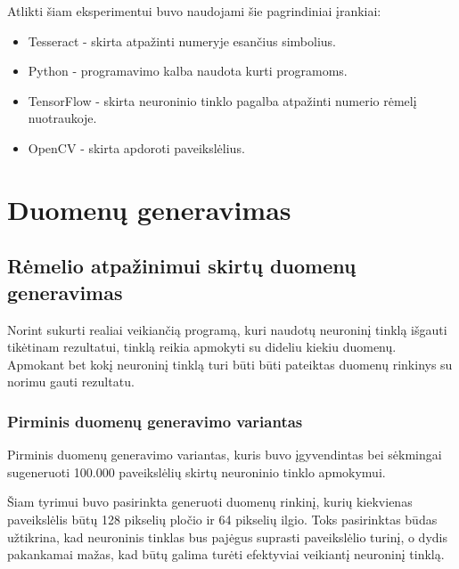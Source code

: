 \documentclass{VUMIFInfBakalaurinis}
\begin{document}
Atlikti šiam eksperimentui buvo naudojami šie pagrindiniai įrankiai:

\begin{itemize}
  \item Tesseract - skirta atpažinti numeryje esančius simbolius.
  \item Python - programavimo kalba naudota kurti programoms.
  \item TensorFlow - skirta neuroninio tinklo pagalba atpažinti numerio rėmelį nuotraukoje.
  \item OpenCV - skirta apdoroti paveikslėlius.
\end{itemize}

\pagebreak
\section{Duomenų generavimas}

\subsection{Rėmelio atpažinimui skirtų duomenų generavimas} \label{Mokymo duomenų generavimas}
Norint sukurti realiai veikiančią programą, kuri naudotų neuroninį tinklą išgauti tikėtinam rezultatui,
tinklą reikia apmokyti su dideliu kiekiu duomenų. Apmokant bet kokį neuroninį tinklą turi būti būti pateiktas
duomenų rinkinys su norimu gauti rezultatu. 

\subsubsection{Pirminis duomenų generavimo variantas}
Pirminis duomenų generavimo variantas, kuris buvo įgyvendintas bei sėkmingai sugeneruoti 100.000 paveikslėlių skirtų neuroninio tinklo apmokymui.

Šiam tyrimui buvo pasirinkta generuoti duomenų rinkinį, kurių kiekvienas paveikslėlis būtų 128 pikselių
pločio ir 64 pikselių ilgio. Toks pasirinktas būdas užtikrina, kad neuroninis tinklas bus pajėgus suprasti 
paveikslėlio turinį, o dydis pakankamai mažas, kad būtų galima turėti efektyviai veikiantį neuroninį tinklą.
\end{document}
